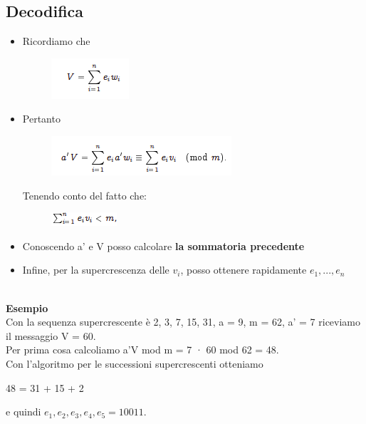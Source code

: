 \subsection{Decodifica}
\begin{itemize}
    \item Ricordiamo che
    
    \begin{figure}[htp]
        \centering
        \includegraphics[scale=0.9]{tesi_stile/img/foto7cap14.png}
    \end{figure}
    
    \item Pertanto 
    
    \begin{figure}[htp]
        \centering
        \includegraphics[scale=0.9]{tesi_stile/img/foto10cap14.png}
    \end{figure}

Tenendo conto del fatto che:
\begin{figure}[htp]
    \centering
    \includegraphics[scale=0.9]{tesi_stile/img/foto11cap14.png}
\end{figure}
    \item Conoscendo a' e V posso calcolare \textbf{la sommatoria precedente}

    \item Infine, per la supercrescenza delle $v_i$, posso ottenere rapidamente $e_1,...,e_n$\\\\
\end{itemize}
\textbf{Esempio}\\
Con la sequenza supercrescente è 2, 3, 7, 15, 31, a = 9, m = 62, a' = 7 riceviamo il messaggio V = 60.
\\Per prima cosa calcoliamo a'V mod m = 7 · 60 mod 62 = 48.
\\Con l’algoritmo per le successioni supercrescenti otteniamo
\begin{center}
    48 = 31 + 15 + 2
\end{center}
e quindi $e_1,e_2,e_3,e_4,e_5 = 10011$.
\newpage

